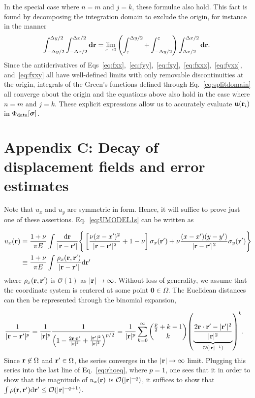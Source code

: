 \documentclass[aps,prl,reprint,twocolumn,groupedaddress,showpacs]{revtex4}
\newcommand{\bsigma}{{\boldsymbol\sigma}}
\def\d{{\bf d}}
\def\dd{\mbox{d}}
\def\r{{\bf r}}
\def\u{{\bf u}}
\begin{document}
\begin{widetext}
In the special case where $n=m$ and $j=k$, these formulae also
hold. This fact is found by decomposing the integration domain to
exclude the origin, for instance in the manner
\begin{equation}
\int_{ -\Delta y/2 }^{\Delta y/2 }\int_{- \Delta x/2 }^{\Delta x/2 } \d\r = \lim_{\varepsilon\to0} \left( \int_\varepsilon^{\Delta y/2}  +  \int_{-\Delta y/2}^\varepsilon   \right)\int_{\Delta x/2}^{\Delta x/2} \d\r.~\label{eq:splitdomain}
\end{equation}
Since the antiderivatives of
Eqs~\ref{eq:fxx},~\ref{eq:fyy},~\ref{eq:fxy},~\ref{eq:fxxx},~\ref{eq:fyxx},
and~\ref{eq:fxxy} all have well-defined limits with only removable
discontinuities at the origin, integrals of the Green's functions
defined through Eq.~\ref{eq:splitdomain} all converge about the origin
and the equations above also hold in the case where $n=m$ and $j=k$.
These explicit expressions allow us to accurately evaluate
$\u(\r_{i})$ in $\Phi_{\rm data}[\bsigma]$.

\section{Appendix C: Decay of displacement fields and error estimates}

Note that $u_x$ and $u_y$ are symmetric in form. Hence, it will
suffice to prove just one of these assertions. Eq.~\ref{eq:UMODEL1s}
can be written as

\begin{align}
u_x(\r) & = \frac{1+\nu}{\pi E} \int \frac{\dd \r}{|\r-\r'|} 
\Bigg\{ \left[ \frac{\nu(x - x')^2}{|\r-\r'|^2} + 1-\nu \right]\sigma_{x}(\r') +\nu\frac{(x-x')(y-y')}{|\r-\r'|^2} \sigma_y(\r')  \Bigg\} \nonumber\\
& \equiv \frac{1+\nu}{\pi E}   \int\frac{\rho_x(\r,\r')}{|\r-\r'|} \dd \r'  \label{eq:rhoeq}
\end{align}
where $\rho_x(\r,\r')$ is $\mathcal{O}(1)$ as
$\vert\r\vert\to\infty$. Without loss of generality, we assume that
the coordinate system is centered at some point
$\mathbf{0}\in\Omega$. The Euclidean distances can then be represented
through the binomial expansion,

\begin{align}
\frac{1}{|\r-\r'|^p} &= \frac{1}{|\r|^p}\frac{1}{\left(1 - \frac{2\r\cdot\r'}{|\r|^2} 
+\frac{\vert\r'\vert^{2}}{\vert\r\vert^{2}}\right)^{p/2}} = \frac{1}{|\r|^p}\sum_{k=0}^\infty {{{p\over 2}+k-1}\choose{k}} 
{\left( \underbrace{ \frac{2\r\cdot\r' - |\r'|^2}{|\r|^2}}_{\mathcal{O}(|\r|^{-1})} \right)}^k.
\end{align}
% 
Since $\r\not\in\Omega$ and $\r'\in\Omega$, the series converges in
the $\vert \r\vert \to \infty$ limit. Plugging this series into the
last line of Eq.~\ref{eq:rhoeq}, where $p=1$, one sees that it in order to show
that the magnitude of $u_x(\r)$ is $\mathcal{O}(|\r|^{-q})$, it
suffices to show that $\int \rho(\r,\r')\dd\r' \leq
{\cal O}(|\r|^{-q+1})$.


\end{widetext}
\end{document}
